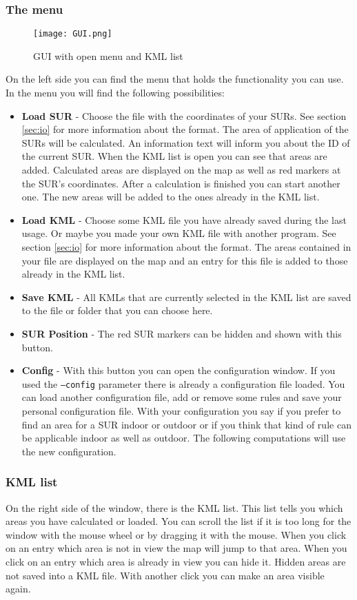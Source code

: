 \documentclass[11pt,fleqn]{book} %
\begin{document}
\subsubsection{The menu}
\begin{figure}
\centering
\texttt{[image: GUI.png]}
\caption{GUI with open menu and KML list}
\end{figure}
On the left side you can find the menu that holds the functionality you can use. In the menu you will find the following possibilities:
\begin{itemize}
	\item \textbf{Load SUR} - Choose the file with the coordinates of your SURs. See section \ref{sec:io} for more information about the format. The area of application of the SURs will be calculated. An information text will inform you about the ID of the current SUR. When the KML list is open you can see that areas are added. Calculated areas are displayed on the map as well as red markers at the SUR's coordinates. After a calculation is finished you can start another one. The new areas will be added to the ones already in the KML list.
	\item \textbf{Load KML} - Choose some KML file you have already saved during the last usage. Or maybe you made your own KML file with another program. See section \ref{sec:io} for more information about the format. The areas contained in your file are displayed on the map and an entry for this file is added to those already in the KML list.
	\item \textbf{Save KML} - All KMLs that are currently selected in the KML list are saved to the file or folder that you can choose here.
	\item \textbf{SUR Position} - The red SUR markers can be hidden and shown with this button.
	\item \textbf{Config} - With this button you can open the configuration window. If you used the \texttt{--config} parameter there is already a configuration file loaded. You can load another configuration file, add or remove some rules and save your personal configuration file. With your configuration you say if you prefer to find an area for a SUR indoor or outdoor or if you think that kind of rule can be applicable indoor as well as outdoor. The following computations will use the new configuration.
\end{itemize}

\subsubsection{KML list}
On the right side of the window, there is the KML list. This list tells you which areas you have calculated or loaded. You can scroll the list if it is too long for the window with the mouse wheel or by dragging it with the mouse. When you click on an entry which area is not in view the map will jump to that area. When you click on an entry which area is already in view you can hide it. Hidden areas are not saved into a KML file. With another click you can make an area visible again.
\end{document}
